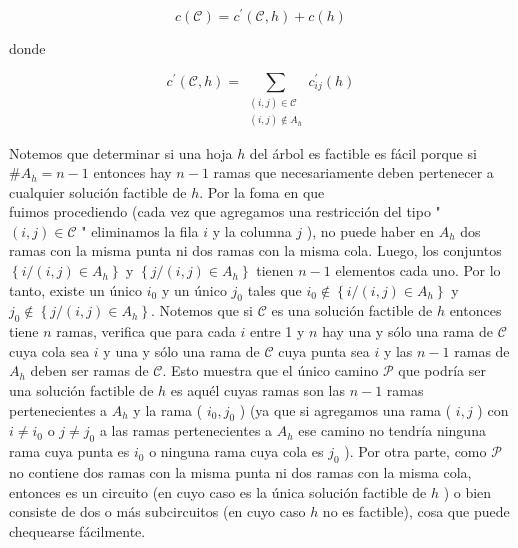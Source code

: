 \documentclass[10pt]{article}
\begin{document}
$$
c(\mathcal{C})=c^{\prime}(\mathcal{C}, h)+c(h)
$$

donde

$$
c^{\prime}(\mathcal{C}, h)=\sum_{\substack{(i, j) \in \mathcal{C} \\(i, j) \notin A_{h}}} c_{i j}^{\prime}(h)
$$

Notemos que determinar si una hoja $h$ del árbol es factible es fácil porque si $\# A_{h}=n-1$ entonces hay $n-1$ ramas que necesariamente deben pertenecer a cualquier solución factible de $h$. Por la foma en que\\
fuimos procediendo (cada vez que agregamos una restricción del tipo " $(i, j) \in \mathcal{C}$ " eliminamos la fila $i$ y la columna $j$ ), no puede haber en $A_{h}$ dos ramas con la misma punta ni dos ramas con la misma cola. Luego, los conjuntos $\left\{i /(i, j) \in A_{h}\right\}$ y $\left\{j /(i, j) \in A_{h}\right\}$ tienen $n-1$ elementos cada uno. Por lo tanto, existe un único $i_{0}$ y un único $j_{0}$ tales que $i_{0} \notin\left\{i /(i, j) \in A_{h}\right\}$ y $j_{0} \notin\left\{j /(i, j) \in A_{h}\right\}$. Notemos que si $\mathcal{C}$ es una solución factible de $h$ entonces tiene $n$ ramas, verifica que para cada $i$ entre 1 y $n$ hay una y sólo una rama de $\mathcal{C}$ cuya cola sea $i$ y una y sólo una rama de $\mathcal{C}$ cuya punta sea $i$ y las $n-1$ ramas de $A_{h}$ deben ser ramas de $\mathcal{C}$. Esto muestra que el único camino $\mathcal{P}$ que podría ser una solución factible de $h$ es aquél cuyas ramas son las $n-1$ ramas pertenecientes a $A_{h}$ y la rama ( $i_{0}, j_{0}$ ) (ya que si agregamos una rama ( $i, j$ ) con $i \neq i_{0}$ o $j \neq j_{0}$ a las ramas pertenecientes a $A_{h}$ ese camino no tendría ninguna rama cuya punta es $i_{0}$ o ninguna rama cuya cola es $j_{0}$ ). Por otra parte, como $\mathcal{P}$ no contiene dos ramas con la misma punta ni dos ramas con la misma cola, entonces es un circuito (en cuyo caso es la única solución factible de $h$ ) o bien consiste de dos o más subcircuitos (en cuyo caso $h$ no es factible), cosa que puede chequearse fácilmente.
\end{document}
